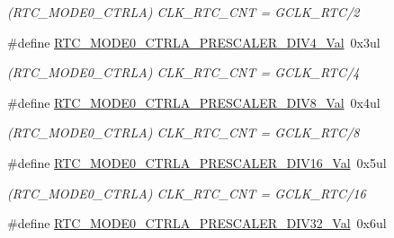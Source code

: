 \begin{DoxyCompactItemize}
\begin{DoxyCompactList}\small\item\em (R\+T\+C\+\_\+\+M\+O\+D\+E0\+\_\+\+C\+T\+R\+L\+A) C\+L\+K\+\_\+\+R\+T\+C\+\_\+\+C\+N\+T = G\+C\+L\+K\+\_\+\+R\+T\+C/2 \end{DoxyCompactList}\item 
\hypertarget{group___s_a_m_l21___r_t_c_gaea5706997088d201a2506cd0c04f6916}{}\#define \hyperlink{group___s_a_m_l21___r_t_c_gaea5706997088d201a2506cd0c04f6916}{R\+T\+C\+\_\+\+M\+O\+D\+E0\+\_\+\+C\+T\+R\+L\+A\+\_\+\+P\+R\+E\+S\+C\+A\+L\+E\+R\+\_\+\+D\+I\+V4\+\_\+\+Val}~0x3ul\label{group___s_a_m_l21___r_t_c_gaea5706997088d201a2506cd0c04f6916}

\begin{DoxyCompactList}\small\item\em (R\+T\+C\+\_\+\+M\+O\+D\+E0\+\_\+\+C\+T\+R\+L\+A) C\+L\+K\+\_\+\+R\+T\+C\+\_\+\+C\+N\+T = G\+C\+L\+K\+\_\+\+R\+T\+C/4 \end{DoxyCompactList}\item 
\hypertarget{group___s_a_m_l21___r_t_c_ga81e7e7964ee437deccfd5bf972ea3aa1}{}\#define \hyperlink{group___s_a_m_l21___r_t_c_ga81e7e7964ee437deccfd5bf972ea3aa1}{R\+T\+C\+\_\+\+M\+O\+D\+E0\+\_\+\+C\+T\+R\+L\+A\+\_\+\+P\+R\+E\+S\+C\+A\+L\+E\+R\+\_\+\+D\+I\+V8\+\_\+\+Val}~0x4ul\label{group___s_a_m_l21___r_t_c_ga81e7e7964ee437deccfd5bf972ea3aa1}

\begin{DoxyCompactList}\small\item\em (R\+T\+C\+\_\+\+M\+O\+D\+E0\+\_\+\+C\+T\+R\+L\+A) C\+L\+K\+\_\+\+R\+T\+C\+\_\+\+C\+N\+T = G\+C\+L\+K\+\_\+\+R\+T\+C/8 \end{DoxyCompactList}\item 
\hypertarget{group___s_a_m_l21___r_t_c_ga62efca2a59d2f5f4d4f91111f58f63d0}{}\#define \hyperlink{group___s_a_m_l21___r_t_c_ga62efca2a59d2f5f4d4f91111f58f63d0}{R\+T\+C\+\_\+\+M\+O\+D\+E0\+\_\+\+C\+T\+R\+L\+A\+\_\+\+P\+R\+E\+S\+C\+A\+L\+E\+R\+\_\+\+D\+I\+V16\+\_\+\+Val}~0x5ul\label{group___s_a_m_l21___r_t_c_ga62efca2a59d2f5f4d4f91111f58f63d0}

\begin{DoxyCompactList}\small\item\em (R\+T\+C\+\_\+\+M\+O\+D\+E0\+\_\+\+C\+T\+R\+L\+A) C\+L\+K\+\_\+\+R\+T\+C\+\_\+\+C\+N\+T = G\+C\+L\+K\+\_\+\+R\+T\+C/16 \end{DoxyCompactList}\item 
\hypertarget{group___s_a_m_l21___r_t_c_ga4e08f6012df659fcc083c758f67ebd6e}{}\#define \hyperlink{group___s_a_m_l21___r_t_c_ga4e08f6012df659fcc083c758f67ebd6e}{R\+T\+C\+\_\+\+M\+O\+D\+E0\+\_\+\+C\+T\+R\+L\+A\+\_\+\+P\+R\+E\+S\+C\+A\+L\+E\+R\+\_\+\+D\+I\+V32\+\_\+\+Val}~0x6ul\label{group___s_a_m_l21___r_t_c_ga4e08f6012df659fcc083c758f67ebd6e}


\end{DoxyCompactItemize}
